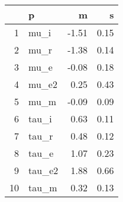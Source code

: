 \begin{table}[ht]
\centering
\begin{tabular}{rlrr}
  \hline
 & p & m & s \\ 
  \hline
1 & mu\_i & -1.51 & 0.15 \\ 
  2 & mu\_r & -1.38 & 0.14 \\ 
  3 & mu\_e & -0.08 & 0.18 \\ 
  4 & mu\_e2 & 0.25 & 0.43 \\ 
  5 & mu\_m & -0.09 & 0.09 \\ 
  6 & tau\_i & 0.63 & 0.11 \\ 
  7 & tau\_r & 0.48 & 0.12 \\ 
  8 & tau\_e & 1.07 & 0.23 \\ 
  9 & tau\_e2 & 1.88 & 0.66 \\ 
  10 & tau\_m & 0.32 & 0.13 \\ 
   \hline
\end{tabular}
\label{tab:param}
\end{table}
